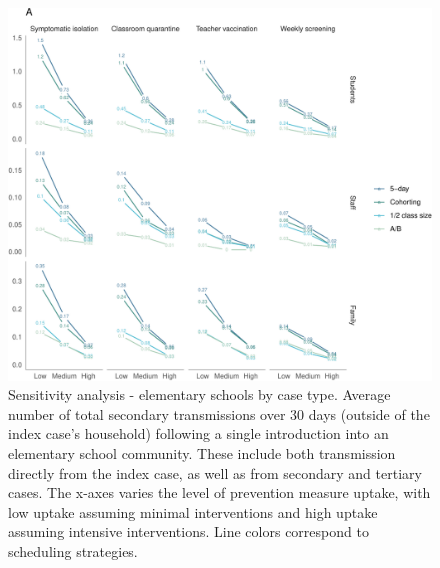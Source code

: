 \documentclass[
]{article}
\begin{document}
\begin{figure}
\centering
\includegraphics{Schools_draft_files/figure-latex/figs1-1.pdf}
\caption{\label{figs2} Sensitivity analysis - elementary schools by case
type. Average number of total secondary transmissions over 30 days
(outside of the index case's household) following a single introduction
into an elementary school community. These include both transmission
directly from the index case, as well as from secondary and tertiary
cases. The x-axes varies the level of prevention measure uptake, with
low uptake assuming minimal interventions and high uptake assuming
intensive interventions. Line colors correspond to scheduling
strategies.}
\end{figure}
\end{document}
